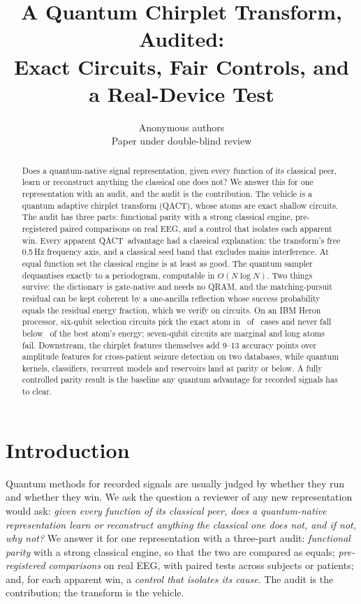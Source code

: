 \documentclass{article}
\title{A Quantum Chirplet Transform, Audited:\\ Exact Circuits, Fair Controls, and a Real-Device Test}
\author{Anonymous authors\\ Paper under double-blind review}
\newcommand{\qact}{QACT}
\begin{document}
\maketitle

\begin{abstract}
Does a quantum-native signal representation, given every function of its classical peer, learn or reconstruct anything the classical one does not? We answer this for one representation with an audit, and the audit is the contribution. The vehicle is a quantum adaptive chirplet transform (\qact), whose atoms are exact shallow circuits. The audit has three parts: functional parity with a strong classical engine, pre-registered paired comparisons on real EEG, and a control that isolates each apparent win. Every apparent \qact\ advantage had a classical explanation: the transform's free 0.5\,Hz frequency axis, and a classical seed band that excludes mains interference. At equal function set the classical engine is at least as good. The quantum sampler dequantises exactly to a periodogram, computable in $O(N\log N)$. Two things survive: the dictionary is gate-native and needs no QRAM, and the matching-pursuit residual can be kept coherent by a one-ancilla reflection whose success probability equals the residual energy fraction, which we verify on circuits. On an IBM Heron processor, six-qubit selection circuits pick the exact atom in \qpuSixPeakOK\ of \qpuSixN\ cases and never fall below \qpuSixSelMin\ of the best atom's energy; seven-qubit circuits are marginal and long atoms fail. Downstream, the chirplet features themselves add 9--13 accuracy points over amplitude features for cross-patient seizure detection on two databases, while quantum kernels, classifiers, recurrent models and reservoirs land at parity or below. A fully controlled parity result is the baseline any quantum advantage for recorded signals has to clear.
\end{abstract}

\section{Introduction}
Quantum methods for recorded signals are usually judged by whether they run and whether they win. We ask the question a reviewer of any new representation would ask: \emph{given every function of its classical peer, does a quantum-native representation learn or reconstruct anything the classical one does not, and if not, why not?} We answer it for one representation with a three-part audit: \emph{functional parity} with a strong classical engine, so that the two are compared as equals; \emph{pre-registered comparisons} on real EEG, with paired tests across subjects or patients; and, for each apparent win, a \emph{control that isolates its cause}. The audit is the contribution; the transform is the vehicle.
\end{document}

